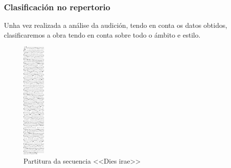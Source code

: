 \subsubsection*{Clasificación no repertorio} \label{Clasificación-dies-irae}
Unha vez realizada a análise da audición, tendo en conta os datos obtidos, clasificaremos a obra tendo en conta sobre todo o ámbito e estilo.
%
%
\vspace*{0.5cm}
\begin{ejercicio}

%

        \vspace*{2.78cm}
\end{ejercicio}

\begin{figure}[h]
    \centering
    \includegraphics[width=0.10\textwidth]{figures/ud-03/dies-irae-solesmes.pdf}
    \caption{Partitura da secuencia <<Dies irae>>}
    \label{fig:dies-irae}
\end{figure}
%